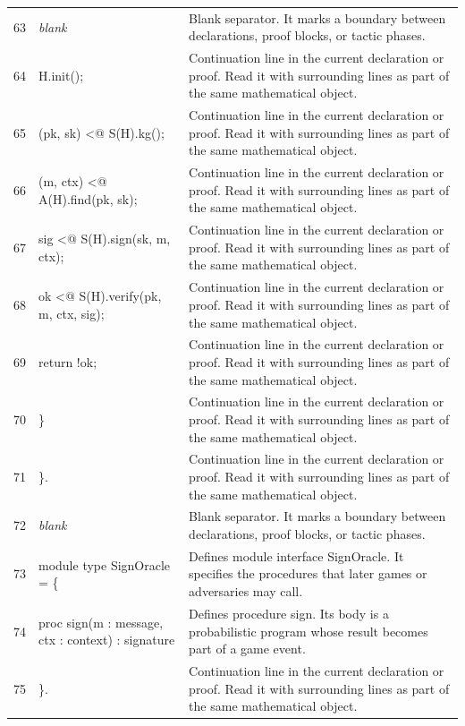 \documentclass[10pt]{article}
\begin{document}
\begin{longtable}{r L{0.53\textwidth} L{0.37\textwidth}}
63 & {\ttfamily\scriptsize \emph{blank}} & Blank separator.  It marks a boundary between declarations, proof blocks, or tactic phases. \\
64 & {\ttfamily\scriptsize     H.init();} & Continuation line in the current declaration or proof.  Read it with surrounding lines as part of the same mathematical object. \\
65 & {\ttfamily\scriptsize     (pk, sk) <@ S(H).kg();} & Continuation line in the current declaration or proof.  Read it with surrounding lines as part of the same mathematical object. \\
66 & {\ttfamily\scriptsize     (m, ctx) <@ A(H).find(pk, sk);} & Continuation line in the current declaration or proof.  Read it with surrounding lines as part of the same mathematical object. \\
67 & {\ttfamily\scriptsize     sig <@ S(H).sign(sk, m, ctx);} & Continuation line in the current declaration or proof.  Read it with surrounding lines as part of the same mathematical object. \\
68 & {\ttfamily\scriptsize     ok <@ S(H).verify(pk, m, ctx, sig);} & Continuation line in the current declaration or proof.  Read it with surrounding lines as part of the same mathematical object. \\
69 & {\ttfamily\scriptsize     return !ok;} & Continuation line in the current declaration or proof.  Read it with surrounding lines as part of the same mathematical object. \\
70 & {\ttfamily\scriptsize   \}} & Continuation line in the current declaration or proof.  Read it with surrounding lines as part of the same mathematical object. \\
71 & {\ttfamily\scriptsize \}.} & Continuation line in the current declaration or proof.  Read it with surrounding lines as part of the same mathematical object. \\
72 & {\ttfamily\scriptsize \emph{blank}} & Blank separator.  It marks a boundary between declarations, proof blocks, or tactic phases. \\
73 & {\ttfamily\scriptsize module type SignOracle = \{} & Defines module interface SignOracle.  It specifies the procedures that later games or adversaries may call. \\
74 & {\ttfamily\scriptsize   proc sign(m : message, ctx : context) : signature} & Defines procedure sign.  Its body is a probabilistic program whose result becomes part of a game event. \\
75 & {\ttfamily\scriptsize \}.} & Continuation line in the current declaration or proof.  Read it with surrounding lines as part of the same mathematical object. \\

\end{longtable}
\end{document}
